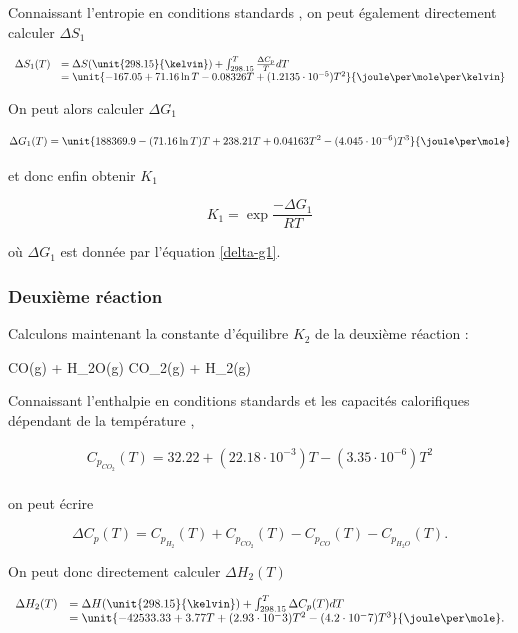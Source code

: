 Connaissant l'entropie en conditions standards \cite{atkins}, on peut 
également directement calculer $\Delta S_1$
 
$$
	\begin{array}{rl}
		 	 \Delta S_1(T)	&=  \Delta S(\unit{298.15}{\kelvin}) + \int_{298.15}^{T} \frac{\Delta C_p}{T}dT \\
											&= \unit{-167.05 + 71.16 \ln T -0.08326 T + (1.2135\cdot 10^{-5}) T^2}{\joule\per\mole\per\kelvin}
	\end{array}
$$	

On peut alors calculer $\Delta G_1$
 
 \begin{equation}
	\Delta G_1(T) = \unit{188369.9 - (71.16\ln T)T + 238.21T + 0.04163 T^2 -(4.045\cdot 10^{-6})T^3}{\joule\per\mole}
	\label{delta-g1}
 \end{equation} 

et donc enfin obtenir $K_1$

$$K_1 = \exp{\frac{-\Delta G_1}{RT}}$$

où $\Delta G_1$ est donnée par l'équation \ref{delta-g1}.

\subsubsection{Deuxième réaction}
Calculons maintenant la constante d'équilibre $K_2$ de la deuxième réaction :

\begin{chemmath} 
	CO(g) + H_2O(g) \Leftrightarrow CO_2(g) + H_2(g)
\end{chemmath} 

Connaissant l'enthalpie en conditions standards \cite{atkins} et les capacités calorifiques dépendant de la température \cite{hc-table},

$$
	\begin{array}{rl}
		C_{p_{CO_2}}(T)=32.22 +(22.18 \cdot 10^{-3})T - (3.35 \cdot 10^{-6})T^2\\
	\end{array}
$$

on peut écrire

$$\Delta C_p(T) = C_{p_{H_2}}(T) + C_{p_{CO_2}}(T) - C_{p_{CO}}(T) - C_{p_{H_2O}}(T).$$

On peut donc directement calculer $\Delta H_2(T)$ 

$$
	\begin{array}{rl}
		 \Delta H_2(T)	&=  \Delta H(\unit{298.15}{\kelvin}) + \int_{298.15}^{T} \Delta C_p(T) dT \\
										&=  \unit{-42533.33+3.77T+(2.93\cdot 10^-3)T^2-(4.2\cdot 10^-7)T^3}{\joule\per\mole}.
	\end{array}
$$	

